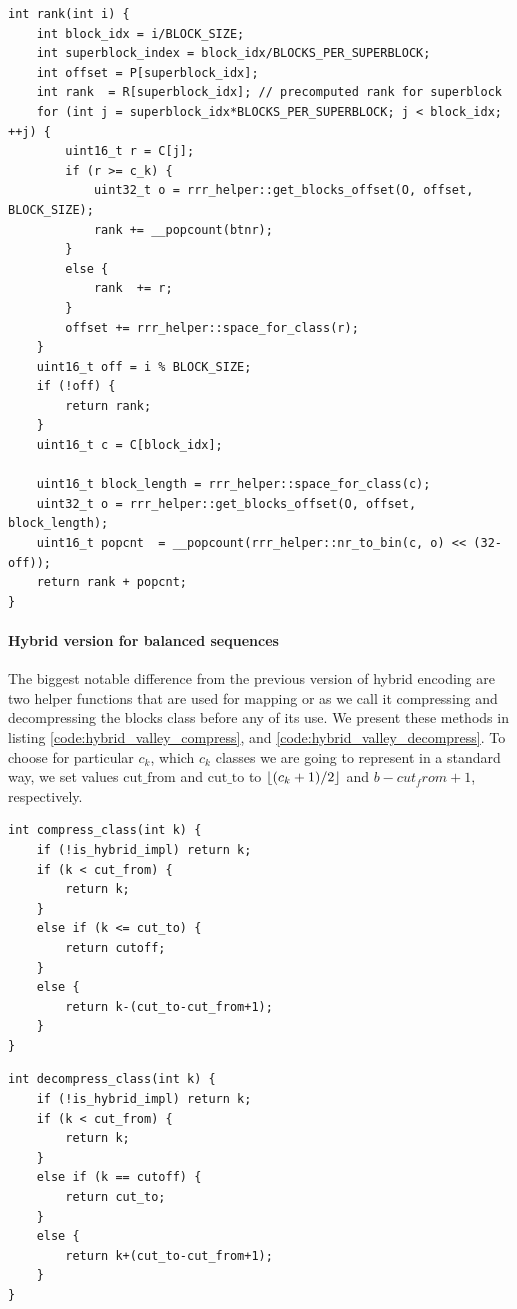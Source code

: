 \begin{lstlisting}
int rank(int i) {
	int block_idx = i/BLOCK_SIZE;
	int superblock_index = block_idx/BLOCKS_PER_SUPERBLOCK;
	int offset = P[superblock_idx];
	int rank  = R[superblock_idx]; // precomputed rank for superblock
	for (int j = superblock_idx*BLOCKS_PER_SUPERBLOCK; j < block_idx; ++j) {
		uint16_t r = C[j];
		if (r >= c_k) {
			uint32_t o = rrr_helper::get_blocks_offset(O, offset, BLOCK_SIZE);
			rank += __popcount(btnr);
		}
		else {
			rank  += r;
		}
		offset += rrr_helper::space_for_class(r);
	}
	uint16_t off = i % BLOCK_SIZE;
	if (!off) {
		return rank;
	}
	uint16_t c = C[block_idx];

	uint16_t block_length = rrr_helper::space_for_class(c);
	uint32_t o = rrr_helper::get_blocks_offset(O, offset, block_length);
	uint16_t popcnt  = __popcount(rrr_helper::nr_to_bin(c, o) << (32-off));
	return rank + popcnt;
}
\end{lstlisting}

\paragraph{Hybrid version for balanced sequences}

The biggest notable difference from the previous version of hybrid encoding are two
helper functions that are used for mapping or as we call it compressing and decompressing
the blocks class before any of its use. We present these methods in listing \ref{code:hybrid_valley_compress},
and \ref{code:hybrid_valley_decompress}. To choose for particular $c_k$, which $c_k$ classes we are
going to represent in a standard way, we set values $\text{cut\_from}$ and $\text{cut\_to}$ to 
$\left\lfloor (c_k+1)/2 \right\rfloor$ and $b-cut_from+1$, respectively.

\begin{lstlisting}
int compress_class(int k) {
	if (!is_hybrid_impl) return k;
	if (k < cut_from) {
		return k;
	}
	else if (k <= cut_to) {
		return cutoff;
	}
	else {
		return k-(cut_to-cut_from+1);
	}
}
\end{lstlisting}

\begin{lstlisting}
int decompress_class(int k) {
	if (!is_hybrid_impl) return k;
	if (k < cut_from) {
		return k;
	}
	else if (k == cutoff) {
		return cut_to;
	}
	else {
		return k+(cut_to-cut_from+1);
	}
}
\end{lstlisting}

